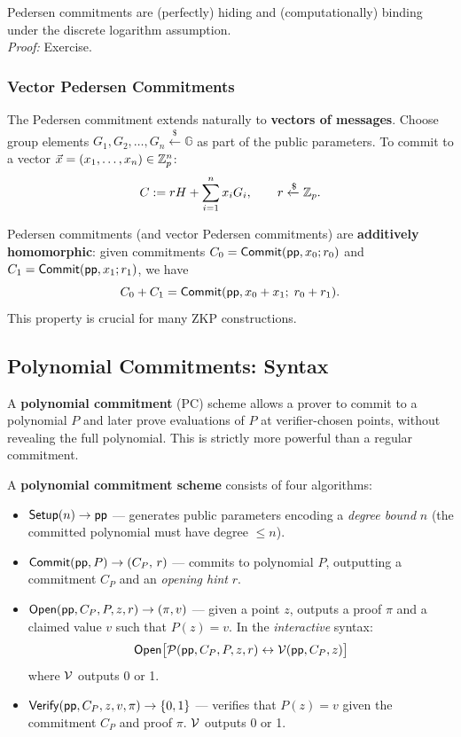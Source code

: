 \documentclass[11pt]{article}
\begin{document}
\begin{theorem}
Pedersen commitments are (perfectly) hiding and (computationally) binding under the discrete logarithm assumption.\\
\emph{Proof:} Exercise.
\end{theorem}

\subsubsection{Vector Pedersen Commitments}

The Pedersen commitment extends naturally to \textbf{vectors of messages}.  Choose group elements $G_1, G_2, \ldots, G_n \xleftarrow{\$} \mathbb{G}$ as part of the public parameters.  To commit to a vector $\vec{x} = (x_1, \ldots, x_n) \in \mathbb{Z}_p^n$:
\[
  C := r H + \sum_{i=1}^n x_i G_i, \qquad r \xleftarrow{\$} \mathbb{Z}_p.
\]

\begin{remark}
Pedersen commitments (and vector Pedersen commitments) are \textbf{additively homomorphic}: given commitments $C_0 = \mathsf{Commit}(\mathsf{pp}, x_0; r_0)$ and $C_1 = \mathsf{Commit}(\mathsf{pp}, x_1; r_1)$, we have
\[
  C_0 + C_1 = \mathsf{Commit}(\mathsf{pp}, x_0 + x_1;\; r_0 + r_1).
\]
This property is crucial for many ZKP constructions.
\end{remark}

\subsection{Polynomial Commitments: Syntax}

A \textbf{polynomial commitment} (PC) scheme allows a prover to commit to a polynomial $P$ and later prove evaluations of $P$ at verifier-chosen points, without revealing the full polynomial.  This is strictly more powerful than a regular commitment.

\begin{definitionbox}
A \textbf{polynomial commitment scheme} consists of four algorithms:
\begin{itemize}
  \item $\mathsf{Setup}(n) \to \mathsf{pp}$ \quad --- generates public parameters encoding a \emph{degree bound} $n$ (the committed polynomial must have degree $\le n$).
  \item $\mathsf{Commit}(\mathsf{pp}, P) \to (C_P,\, r)$ \quad --- commits to polynomial $P$, outputting a commitment $C_P$ and an \emph{opening hint} $r$.
  \item $\mathsf{Open}(\mathsf{pp}, C_P, P, z, r) \to (\pi, v)$ \quad --- given a point $z$, outputs a proof $\pi$ and a claimed value $v$ such that $P(z) = v$.  In the \emph{interactive} syntax:
    \[
      \mathsf{Open}\bigl[\mathcal{P}(\mathsf{pp}, C_P, P, z, r) \leftrightarrow \mathcal{V}(\mathsf{pp}, C_P, z)\bigr]
    \]
    where $\mathcal{V}$ outputs 0 or 1.
  \item $\mathsf{Verify}(\mathsf{pp}, C_P, z, v, \pi) \to \{0,1\}$ \quad --- verifies that $P(z) = v$ given the commitment $C_P$ and proof $\pi$.  $\mathcal{V}$ outputs 0 or 1.
\end{itemize}
\end{definitionbox}
\end{document}
